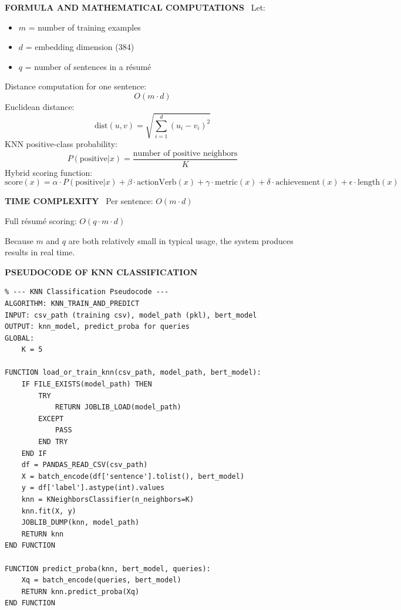 \documentclass[12pt]{article}
\renewcommand{\paragraph}[1]{\noindent\textbf{\MakeUppercase{#1}}\ }
\begin{document}
\paragraph{FORMULA AND MATHEMATICAL COMPUTATIONS}
Let:
\begin{itemize}
  \item $m$ = number of training examples
  \item $d$ = embedding dimension (384)
  \item $q$ = number of sentences in a résumé
\end{itemize}
Distance computation for one sentence:
\[
O(m \cdot d)
\]
Euclidean distance:
\[
\text{dist}(u, v) = \sqrt{\sum_{i=1}^d (u_i - v_i)^2}
\]
KNN positive-class probability:
\[
P(\text{positive}|x) = \frac{\text{number of positive neighbors}}{K}
\]
Hybrid scoring function:
\[
\text{score}(x) = \alpha \cdot P(\text{positive}|x) + \beta \cdot \text{actionVerb}(x) + \gamma \cdot \text{metric}(x) + \delta \cdot \text{achievement}(x) + \epsilon \cdot \text{length}(x)
\]

\paragraph{TIME COMPLEXITY}
Per sentence: $O(m \cdot d)$

Full résumé scoring: $O(q \cdot m \cdot d)$

Because $m$ and $q$ are both relatively small in typical usage, the system produces results in real time.

\paragraph{PSEUDOCODE OF KNN CLASSIFICATION}
\begin{verbatim}
% --- KNN Classification Pseudocode ---
ALGORITHM: KNN_TRAIN_AND_PREDICT
INPUT: csv_path (training csv), model_path (pkl), bert_model
OUTPUT: knn_model, predict_proba for queries
GLOBAL:
    K = 5

FUNCTION load_or_train_knn(csv_path, model_path, bert_model):
    IF FILE_EXISTS(model_path) THEN
        TRY
            RETURN JOBLIB_LOAD(model_path)
        EXCEPT
            PASS
        END TRY
    END IF
    df = PANDAS_READ_CSV(csv_path)
    X = batch_encode(df['sentence'].tolist(), bert_model)
    y = df['label'].astype(int).values
    knn = KNeighborsClassifier(n_neighbors=K)
    knn.fit(X, y)
    JOBLIB_DUMP(knn, model_path)
    RETURN knn
END FUNCTION

FUNCTION predict_proba(knn, bert_model, queries):
    Xq = batch_encode(queries, bert_model)
    RETURN knn.predict_proba(Xq)
END FUNCTION
\end{verbatim}
\end{document}
